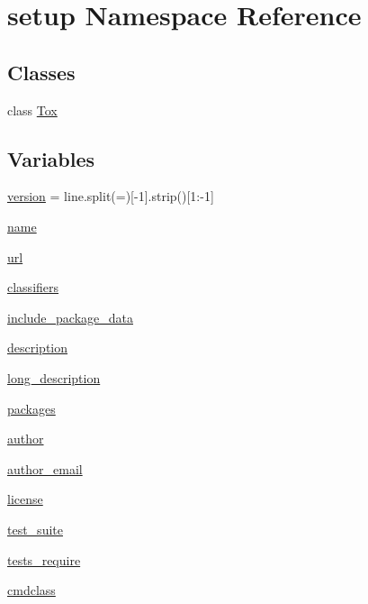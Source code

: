 \hypertarget{namespacesetup}{}\section{setup Namespace Reference}
\label{namespacesetup}
\subsection*{Classes}
\begin{DoxyCompactItemize}
\item 
class \hyperlink{classsetup_1_1_tox}{Tox}
\end{DoxyCompactItemize}
\subsection*{Variables}
\begin{DoxyCompactItemize}
\item 
\hyperlink{namespacesetup_a2aa722b36a933088812b50ea79b97a5c}{version} = line.\+split(\textquotesingle{}=\textquotesingle{})\mbox{[}-\/1\mbox{]}.strip()\mbox{[}1\+:-\/1\mbox{]}
\item 
\hyperlink{namespacesetup_ab3a7a0638d76a01367c5bc3cc699447f}{name}
\item 
\hyperlink{namespacesetup_afc13124aa5c0124e84e1d965e3f4b0fb}{url}
\item 
\hyperlink{namespacesetup_abe96a9c38c1c61f9f0fdb002c482f785}{classifiers}
\item 
\hyperlink{namespacesetup_a35139105b25ef46629d31888bad595d8}{include\+\_\+package\+\_\+data}
\item 
\hyperlink{namespacesetup_aedf461ec52a946bda975938ba0b93ec0}{description}
\item 
\hyperlink{namespacesetup_a4cda9dbfb952875376a0749fe08a5bde}{long\+\_\+description}
\item 
\hyperlink{namespacesetup_aff2375a361fd5865c77bd9aa093be747}{packages}
\item 
\hyperlink{namespacesetup_a3a57a4772d418a06835249cbade0d86a}{author}
\item 
\hyperlink{namespacesetup_a5b08034343aa2be607722a8b315f3625}{author\+\_\+email}
\item 
\hyperlink{namespacesetup_a8ed6f50a28bd6a8794f8e1153baa6de9}{license}
\item 
\hyperlink{namespacesetup_afd7a7f31bfa5027bfe335aedfcc1b70e}{test\+\_\+suite}
\item 
\hyperlink{namespacesetup_a6369bb060267ccf90b93519796e7cc2c}{tests\+\_\+require}
\item 
\hyperlink{namespacesetup_aa128e9ba397a7b5b03bb964c4d14268d}{cmdclass}
\end{DoxyCompactItemize}



